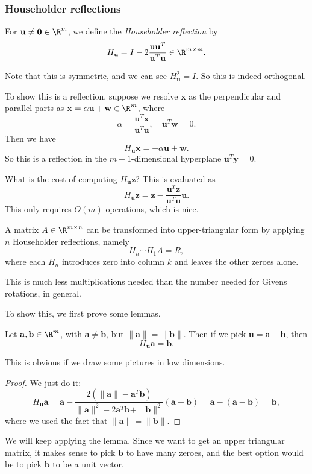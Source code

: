 \documentclass[a4paper]{article}
\begin{document}
\subsubsection*{Householder reflections}
\begin{defi}
  For $\mathbf{u} \not= \mathbf{0} \in \R^m$, we define the \emph{Householder reflection} by
  \[
    H_{\mathbf{u}} = I - 2\frac{\mathbf{u}\mathbf{u}^T}{ \mathbf{u}^T \mathbf{u}} \in \R^{m \times m}.
  \]
\end{defi}
Note that this is symmetric, and we can see $H_{\mathbf{u}}^2 = I$. So this is indeed orthogonal.

To show this is a reflection, suppose we resolve $\mathbf{x}$ as the perpendicular and parallel parts as $\mathbf{x} = \alpha \mathbf{u} + \mathbf{w} \in \R^m$, where
\[
  \alpha = \frac{\mathbf{u}^T \mathbf{x}}{\mathbf{u}^T \mathbf{u}},\quad \mathbf{u}^T \mathbf{w} = 0.
\]
Then we have
\[
  H_{\mathbf{u}} \mathbf{x} = -\alpha \mathbf{u} + \mathbf{w}.
\]
So this is a reflection in the $m - 1$-dimensional hyperplane $\mathbf{u}^T \mathbf{y} = 0$.

What is the cost of computing $H_{\mathbf{u}}\mathbf{z}$? This is evaluated as
\[
  H_{\mathbf{u}}\mathbf{z} = \mathbf{z} - \frac{\mathbf{u}^T \mathbf{z}}{\mathbf{u}^T \mathbf{u}}\mathbf{u}.
\]
This only requires $O(m)$ operations, which is nice.

\begin{prop}
  A matrix $A \in \R^{m \times n}$ can be transformed into upper-triangular form by applying $n$ Householder reflections, namely
  \[
    H_n \cdots H_1 A = R,
  \]
  where each $H_n$ introduces zero into column $k$ and leaves the other zeroes alone.
\end{prop}
This is much less multiplications needed than the number needed for Givens rotations, in general.

To show this, we first prove some lemmas.

\begin{lemma}
  Let $\mathbf{a}, \mathbf{b} \in \R^m$, with $\mathbf{a} \not= \mathbf{b}$, but $\|\mathbf{a}\| = \|\mathbf{b}\|$. Then if we pick $\mathbf{u} = \mathbf{a} - \mathbf{b}$, then
  \[
    H_\mathbf{u} \mathbf{a} = \mathbf{b}.
  \]
\end{lemma}
This is obvious if we draw some pictures in low dimensions.
\begin{proof}
  We just do it:
  \[
    H_\mathbf{u} \mathbf{a} = \mathbf{a} - \frac{2(\|\mathbf{a}\| - \mathbf{a}^T \mathbf{b})}{\|\mathbf{a}\|^2 - 2\mathbf{a}^T \mathbf{b} + \|\mathbf{b}\|^2} (\mathbf{a} - \mathbf{b}) = \mathbf{a} - (\mathbf{a} - \mathbf{b}) = \mathbf{b},
  \]
  where we used the fact that $\|\mathbf{a}\| = \|\mathbf{b}\|$.
\end{proof}
We will keep applying the lemma. Since we want to get an upper triangular matrix, it makes sense to pick $\mathbf{b}$ to have many zeroes, and the best option would be to pick $\mathbf{b}$ to be a unit vector.
\end{document}
